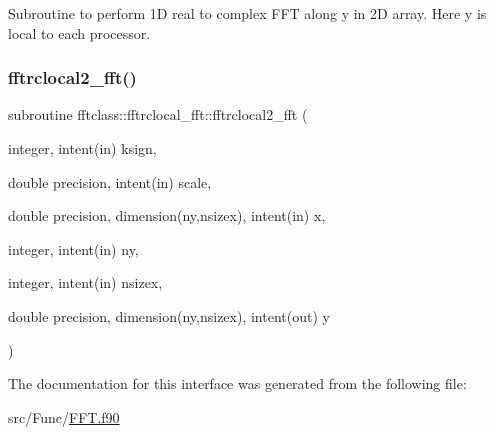 Subroutine to perform 1D real to complex F\+FT along y in 2D array. Here y is local to each processor. 

\mbox{\label{interfacefftclass_1_1fftrclocal__fft_ab6b99a37c96bc0208402cced3fc85b5f}} 
\subsubsection{\texorpdfstring{fftrclocal2\_fft()}{fftrclocal2\_fft()}}
{\footnotesize\ttfamily subroutine fftclass\+::fftrclocal\+\_\+fft\+::fftrclocal2\+\_\+fft (\begin{DoxyParamCaption}\item[{integer, intent(in)}]{ksign,  }\item[{double precision, intent(in)}]{scale,  }\item[{double precision, dimension(ny,nsizex), intent(in)}]{x,  }\item[{integer, intent(in)}]{ny,  }\item[{integer, intent(in)}]{nsizex,  }\item[{double precision, dimension(ny,nsizex), intent(out)}]{y }\end{DoxyParamCaption})}



The documentation for this interface was generated from the following file\+:\begin{DoxyCompactItemize}
\item 
src/\+Func/\mbox{\hyperlink{_f_f_t_8f90}{F\+F\+T.\+f90}}\end{DoxyCompactItemize}
